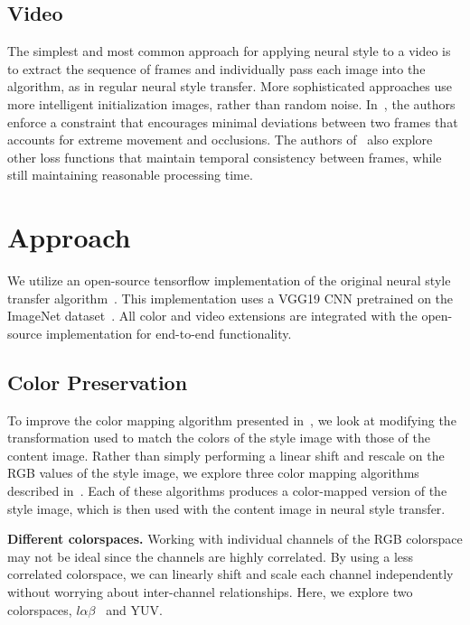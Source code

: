 \documentclass[10pt,twocolumn,letterpaper]{article}
\begin{document}
\subsection{Video}
The simplest and most common approach for applying neural style to a video is to extract the sequence of frames and individually pass each image into the algorithm, as in regular neural style transfer. More sophisticated approaches use more intelligent initialization images, rather than random noise. In~\cite{video1}, the authors enforce a constraint that encourages minimal deviations between two frames that accounts for extreme movement and occlusions. The authors of~\cite{video2} also explore other loss functions that maintain temporal consistency between frames, while still maintaining reasonable processing time.

\section{Approach}
We utilize an open-source tensorflow implementation of the original neural style transfer algorithm~\cite{neuralstyle}. This implementation uses a VGG19 CNN pretrained on the ImageNet dataset~\cite{vgg}. All color and video extensions are integrated with the open-source implementation for end-to-end functionality.

\subsection{Color Preservation}
To improve the color mapping algorithm presented in~\cite{gatys-color}, we look at modifying the transformation used to match the colors of the style image with those of the content image. Rather than simply performing a linear shift and rescale on the RGB values of the style image, we explore three color mapping algorithms described in~\cite{color}. Each of these algorithms produces a color-mapped version of the style image, which is then used with the content image in neural style transfer.

\bigbreak\noindent\textbf{Different colorspaces.}
Working with individual channels of the RGB colorspace may not be ideal since the channels are highly correlated. By using a less correlated colorspace, we can linearly shift and scale each channel independently without worrying about inter-channel relationships. Here, we explore two colorspaces, $l\alpha\beta$~\cite{lab} and YUV.
\end{document}
